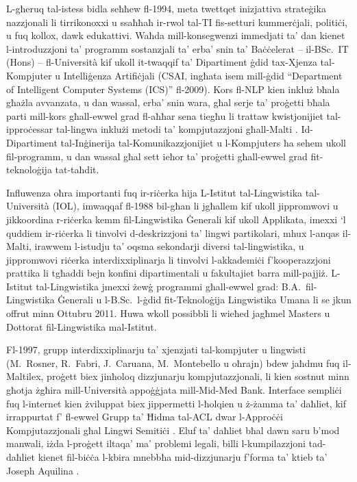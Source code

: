 \begin{multicols}{2}
L-għeruq tal-istess bidla seħħew fl-1994, meta twettqet inizjattiva strateġika nazzjonali li tirrikonoxxi u ssaħħaħ ir-rwol tal-TI fis-setturi kummerċjali, politiċi, u fuq kollox, dawk edukattivi. Waħda mill-konsegwenzi immedjati ta’ dan kienet l-introduzzjoni ta’ programm sostanzjali ta’ erba’ snin ta’ Baċċelerat -- il-BSc.~IT (Hons) -- fl-Università kif ukoll it-twaqqif ta’ Dipartiment ġdid tax-Xjenza tal-Kompjuter u Intelliġenza Artifiċjali (CSAI, ingħata isem mill-ġdid ``Department of Intelligent Computer Systems (ICS)'' fl-2009). Kors fl-NLP kien inkluż bħala għażla avvanzata, u dan wassal, erba’ snin wara, għal serje ta’ proġetti bħala parti mill-kors għall-ewwel grad  fl-aħħar sena tiegħu li trattaw kwistjonijiet tal-ipproċessar tal-lingwa inklużi metodi ta' kompjutazzjoni għall-Malti \cite{Galea:1999, Mangion:1999, Farrugia:1999, Farrugia:2000, Mizzi:2000, Bajada:2004, Attard:2005, Farrugia:2008, Farrugia:2009, Vella:2010}. Id-Dipartiment tal-Inġinerija tal-Komunikazzjonijiet u l-Kompjuters ħa sehem ukoll fil-programm, u dan wassal għal sett ieħor ta’ proġetti għall-ewwel grad fit-teknoloġija tat-taħdit.

Influwenza oħra importanti fuq ir-riċerka hija L-Istitut tal-Lingwistika tal-Università (IOL), imwaqqaf fl-1988 bil-għan li jgħallem kif ukoll jippromwovi u jikkoordina r-riċerka kemm fil-Lingwistika Ġenerali kif ukoll Applikata, imexxi ‘l quddiem ir-riċerka li tinvolvi d-deskrizzjoni ta’ lingwi partikolari, mhux l-anqas il-Malti, irawwem l-istudju ta’ oqsma sekondarji diversi tal-lingwistika, u jippromwovi riċerka interdixxiplinarja li tinvolvi l-akkademiċi f’kooperazzjoni prattika li tgħaddi bejn konfini dipartimentali u fakultajiet barra mill-pajjiż. L-Istitut tal-Lingwistika jmexxi żewġ programmi għall-ewwel grad: B.A.~fil-Lingwistika Ġenerali u l-B.Sc.~l-ġdid fit-Teknoloġija Lingwistika Umana li se jkun offrut minn Ottubru 2011. Huwa wkoll possibbli li wieħed jagħmel Masters u Dottorat fil-Lingwistika mal-Istitut.

Fl-1997, grupp interdixxiplinarju ta’ xjenzjati tal-kompjuter u lingwisti (M.~Rosner, R.~Fabri, J.~Caruana, M.~Montebello u oħrajn) bdew jaħdmu fuq il-Maltilex, proġett biex jinħoloq dizzjunarju kompjutazzjonali, li kien sostnut minn għotja żgħira mill-Università appoġġjata mill-Mid-Med Bank. Interface sempliċi fuq l-internet kien żviluppat biex jippermetti l-ħolqien u ż-żamma ta’ daħliet, kif irrappurtat f’ \cite{Rosner-et-al:1998} fl-ewwel Grupp ta’ Ħidma tal-ACL dwar l-Approċċi Kompjutazzjonali għal Lingwi Semitiċi \cite{Rosner-et-al:1998}.  
Eluf ta’ daħliet bħal dawn saru b’mod manwali, iżda l-proġett iltaqa’ ma’ problemi legali, billi l-kumpilazzjoni tad-daħliet kienet fil-biċċa l-kbira mnebbħa mid-dizzjunarju f’forma ta’ ktieb ta’ Joseph Aquilina \cite{Aquilina:1987,Aquilina:1990}.


\end{multicols}

